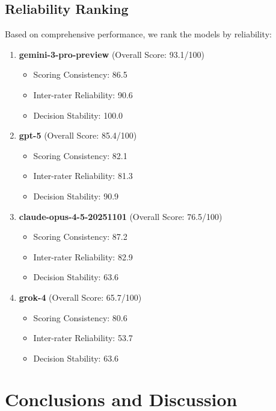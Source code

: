 \documentclass[12pt,a4paper]{article}
\begin{document}
\subsection{Reliability Ranking}

Based on comprehensive performance, we rank the models by reliability:

\begin{enumerate}
\item \textbf{gemini-3-pro-preview} (Overall Score: 93.1/100)
\begin{itemize}
    \item Scoring Consistency: 86.5
    \item Inter-rater Reliability: 90.6
    \item Decision Stability: 100.0
\end{itemize}

\item \textbf{gpt-5} (Overall Score: 85.4/100)
\begin{itemize}
    \item Scoring Consistency: 82.1
    \item Inter-rater Reliability: 81.3
    \item Decision Stability: 90.9
\end{itemize}

\item \textbf{claude-opus-4-5-20251101} (Overall Score: 76.5/100)
\begin{itemize}
    \item Scoring Consistency: 87.2
    \item Inter-rater Reliability: 82.9
    \item Decision Stability: 63.6
\end{itemize}

\item \textbf{grok-4} (Overall Score: 65.7/100)
\begin{itemize}
    \item Scoring Consistency: 80.6
    \item Inter-rater Reliability: 53.7
    \item Decision Stability: 63.6
\end{itemize}

\end{enumerate}

\newpage


\section{Conclusions and Discussion}
\end{document}
